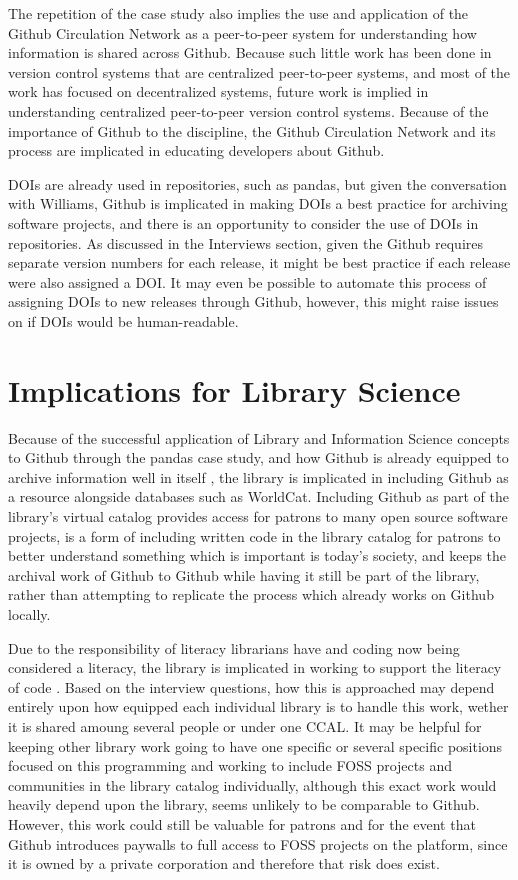 The repetition of the case study also implies the use and application of the Github Circulation Network as a peer-to-peer system for understanding how information is shared across Github. Because such little work has been done in version control systems that are centralized peer-to-peer systems, and most of the work has focused on decentralized systems, future work is implied in understanding centralized peer-to-peer version control systems. Because of the importance of Github to the discipline, the Github Circulation Network and its process are implicated in educating developers about Github. 

DOIs are already used in repositories, such as pandas, but given the conversation with Williams, Github is implicated in making DOIs a best practice for archiving software projects, and there is an opportunity to consider the use of DOIs in repositories. As discussed in the Interviews section, given the Github requires separate version numbers for each release, it might be best practice if each release were also assigned a DOI. It may even be possible to automate this process of assigning DOIs to new releases through Github, however, this might raise issues on if DOIs would be human-readable. 

\section{Implications for Library Science}

Because of the successful application of Library and Information Science concepts to Github through the pandas case study, and how Github is already equipped to archive information well in itself \cite{patrickinterview} \cite{timinterview}, the library is implicated in including Github as a resource alongside databases such as WorldCat. Including Github as part of the library's virtual catalog provides access for patrons to many open source software projects, is a form of including written code in the  library catalog for patrons to better understand something which is important is today's society, and keeps the archival work of Github to Github while having it still be part of the library, rather than attempting to replicate the process which already works on Github locally. 

Due to the responsibility of literacy librarians have and coding now being considered a literacy, the library is implicated in working to support the literacy of code \cite{rubin2016foundationslis} \cite{vee2017coding}. Based on the interview questions, how this is approached may depend entirely upon how equipped each individual library is to handle this work, wether it is shared amoung several people or under one CCAL. It may be helpful for keeping other library work going to have one specific or several specific positions focused on this programming and working to include FOSS projects and communities in the library catalog individually, although this exact work would heavily depend upon the library, seems unlikely to be comparable to Github. However, this work could still be valuable for patrons and for the event that Github introduces paywalls to full access to FOSS projects on the platform, since it is owned by a private corporation and therefore that risk does exist. 

